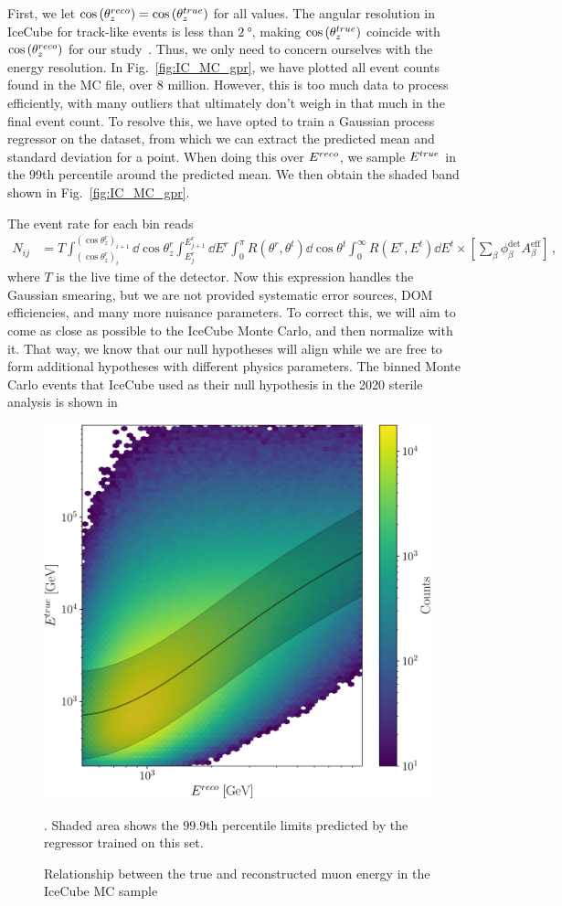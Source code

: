\documentclass{thesis}
\begin{document}
First, we let $\cos{(\theta_z^{reco})} = \cos{(\theta_z^{true})}$ for all values. The angular resolution in IceCube for track-like events is less than $\SI{2}{\degree}$, making $\cos{(\theta_z^{true})}$ coincide with $\cos{(\theta_z^{reco})}$ for our study~\cite{IC2020}.
Thus, we only need to concern ourselves with the energy resolution.
In Fig.~\ref{fig:IC_MC_gpr}, we have plotted all event counts found in the MC file, over 8 million. However, this is too much data to process efficiently, with many outliers that ultimately don't weigh in 
that much in the final event count. To resolve this, we have opted to train a Gaussian process regressor on the dataset, from which we can extract the predicted mean and standard deviation for a point.
When doing this over $E^{reco}$, we sample $E^{true}$ in the 99th percentile around the predicted mean. We then obtain the shaded band shown in Fig.~\ref{fig:IC_MC_gpr}. %

The event rate for each bin reads
\begin{align}\label{eq:ICevents}
    N_{ij} &= T \int_{(\cos{\theta_z^r})_i}^{(\cos{\theta_z^r})_{i+1}} \dd \cos{\theta^r_z} \int_{E^r_{j}}^{E^r_{j+1}} \dd E^r \int_0^\pi R(\theta^r,\theta^t) \dd \cos{\theta^t} \int_0^\infty R(E^r,E^t) \dd E^t
    \times \left[ \sum_\beta \phi_\beta^\text{det}  A^\text{eff}_\beta\right]\,,
\end{align}
where $T$ is the live time of the detector. Now this expression handles the Gaussian smearing, but we are not provided systematic error sources, DOM efficiencies, and many more nuisance parameters. To correct this,
we will aim to come as close as possible to the IceCube Monte Carlo, and then normalize with it. That way, we know that our null hypotheses will align while we are free to form additional hypotheses with different 
physics parameters. The binned Monte Carlo events that IceCube used as their null hypothesis in the 2020 sterile analysis is shown in %


\begin{figure}[!tb]\label{fig:IC_MC_gpr}
    \begin{center}
       \includegraphics[width=0.4\linewidth]{figures/IC_MC_gpr.pdf}
    \end{center}
    \caption{Relationship between the true and reconstructed muon energy in the IceCube MC sample~\cite{IC2016}}\label{fig:IC_MC_counts}. Shaded area shows the $99.9$th percentile limits predicted by the regressor trained on this set.
 \end{figure}
\end{document}
